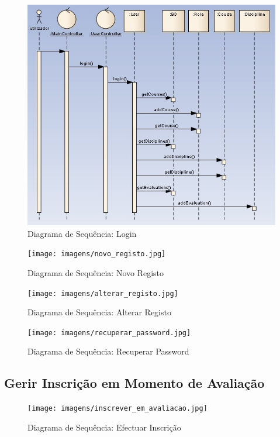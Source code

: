 \begin{figure}[!htbp]
\centering
\includegraphics{imagens/login.jpg}
\caption{Diagrama de Sequência: Login}
\label{fig:login}
\end{figure}

\begin{figure}[!htbp]
\centering
\texttt{[image: imagens/novo\_registo.jpg]}
\caption{Diagrama de Sequência: Novo Registo}
\label{fig:novo_registo}
\end{figure}

\begin{figure}[!htbp]
\centering
\texttt{[image: imagens/alterar\_registo.jpg]}
\caption{Diagrama de Sequência: Alterar Registo}
\label{fig:alterar_registo}
\end{figure}

\begin{figure}[!htbp]
\centering
\texttt{[image: imagens/recuperar\_password.jpg]}
\caption{Diagrama de Sequência: Recuperar Password}
\label{fig:recuperar_password}
\end{figure}

\clearpage
\subsection{Gerir Inscrição em Momento de Avaliação}

\begin{figure}[!htbp]
\centering
\texttt{[image: imagens/inscrever\_em\_avaliacao.jpg]}
\caption{Diagrama de Sequência: Efectuar Inscrição}
\label{fig:inscrever_em_avaliacao}
\end{figure}

